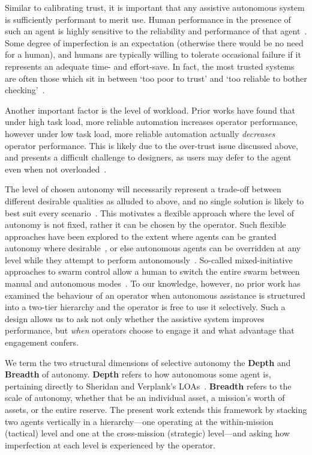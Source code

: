 \documentclass[10pt]{article}
\theoremstyle{definition}
\begin{document}
Similar to calibrating trust, it is important that any assistive autonomous system is sufficiently performant to merit use. Human performance in the presence of such an agent is highly sensitive to the reliability and performance of that agent~\cite{rovira_effects_2007}. Some degree of imperfection is an expectation (otherwise there would be no need for a human), and humans are typically willing to tolerate occasional failure if it represents an adequate time- and effort-save. In fact, the most trusted systems are often those which sit in between `too poor to trust' and `too reliable to bother checking'~\cite{kate2018trustworthiness}.

Another important factor is the level of workload. Prior works have found that under high task load, more reliable automation increases operator performance, however under low task load, more reliable automation actually \textit{decreases} operator performance. This is likely due to the over-trust issue discussed above, and presents a difficult challenge to designers, as users may defer to the agent even when not overloaded~\cite{parasuraman_adaptive_2009}.

The level of chosen autonomy will necessarily represent a trade-off between different desirable qualities as alluded to above, and no single solution is likely to best suit every scenario~\cite{miller_delegation_nodate}. This motivates a flexible approach where the level of autonomy is not fixed, rather it can be chosen by the operator. Such flexible approaches have been explored to the extent where agents can be granted autonomy where desirable~\cite{hardin_using_nodate}, or else autonomous agents can be overridden at any level while they attempt to perform autonomously~\cite{valero-gomez_impact_2011}. So-called mixed-initiative approaches to swarm control allow a human to switch the entire swarm between manual and autonomous modes~\cite{nam_trust_2018}. To our knowledge, however, no prior work has examined the behaviour of an operator when autonomous assistance is structured into a two-tier hierarchy and the operator is free to use it selectively. Such a design allows us to ask not only whether the assistive system improves performance, but \emph{when} operators choose to engage it and what advantage that engagement confers.

We term the two structural dimensions of selective autonomy the \textbf{Depth} and \textbf{Breadth} of autonomy. \textbf{Depth} refers to how autonomous some agent is, pertaining directly to Sheridan and Verplank's LOAs~\cite{sheridan1978human}. \textbf{Breadth} refers to the scale of autonomy, whether that be an individual asset, a mission's worth of assets, or the entire reserve. The present work extends this framework by stacking two agents vertically in a hierarchy---one operating at the within-mission (tactical) level and one at the cross-mission (strategic) level---and asking how imperfection at each level is experienced by the operator.
\end{document}
